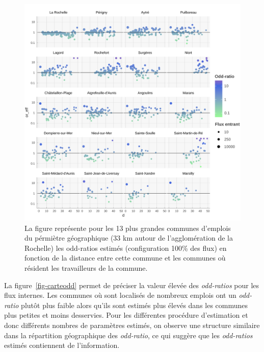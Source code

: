 \documentclass[
  10pt,
  a4paper,
  numbers=noendperiod,
  DIV=9]{scrreprt}
\begin{document}
\begin{figure}[htb]

{\centering \includegraphics[width=1\textwidth,height=\textheight]{./output/spectre effectif par DCLT 100.png}

}

\caption[Odd-ratio par commune d'emploi fonction de la distance aux
communes de résidence (spectre emplois)]{\label{fig-spectreE}La figure
représente pour les 13 plus grandes communes d'emplois du pérmiètre
géographique (33 km autour de l'agglomération de la Rochelle) les
odd-ratios estimés (configuration 100\% des flux) en fonction de la
distance entre cette commune et les communes où résident les
travailleurs de la commune.}

\end{figure}

La figure~\ref{fig-carteodd} permet de préciser la valeur élevée des
\emph{odd-ratios} pour les flux internes. Les communes où sont localisés
de nombreux emplois ont un \emph{odd-ratio} plutôt plus faible alors
qu'ils sont estimés plus élevés dans les communes plus petites et moins
desservies. Pour les différentes procédure d'estimation et donc
différents nombres de paramètres estimés, on observe une structure
similaire dans la répartition géographique des \emph{odd-ratio}, ce qui
suggère que les \emph{odd-ratios} estimés contiennent de l'information.
\end{document}
